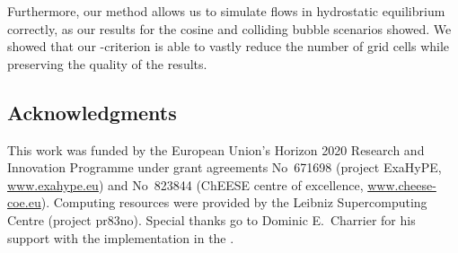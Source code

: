 \documentclass[runningheads]{llncs}
\begin{document}
Furthermore, our method allows us to simulate flows in hydrostatic equilibrium correctly, as our results for the cosine and colliding bubble scenarios showed.
We showed that our \amr{}-criterion is able to vastly reduce the number of grid cells while preserving the quality of the results.

\subsection*{Acknowledgments}
This work was funded by the European Union’s Horizon 2020 Research and Innovation Programme under grant agreements 
No~671698 (project ExaHyPE, \url{www.exahype.eu}) and 
No~823844 (ChEESE centre of excellence, \url{www.cheese-coe.eu}).
Computing resources were provided by the Leibniz Supercomputing Centre (project pr83no).
Special thanks go to Dominic E.\ Charrier for his support with the implementation in the \exahypeengine{}.

\printbibliography{}
\end{document}
